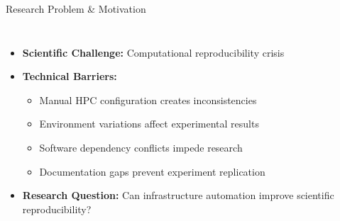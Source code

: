 \documentclass[aspectratio=169]{beamer}
\begin{document}
\begin{frame}{Research Problem \& Motivation}
  \begin{columns}
    \begin{itemize}
      \item \textbf{Scientific Challenge:} Computational reproducibility crisis
      \item \textbf{Technical Barriers:}
        \begin{itemize}
          \item Manual HPC configuration creates inconsistencies
          \item Environment variations affect experimental results
          \item Software dependency conflicts impede research
          \item Documentation gaps prevent experiment replication
        \end{itemize}
      \item \textbf{Research Question:} Can infrastructure automation improve scientific reproducibility?
    \end{itemize}
    
    \begin{center}
    \end{center}
  \end{columns}
\end{frame}
\end{document}
